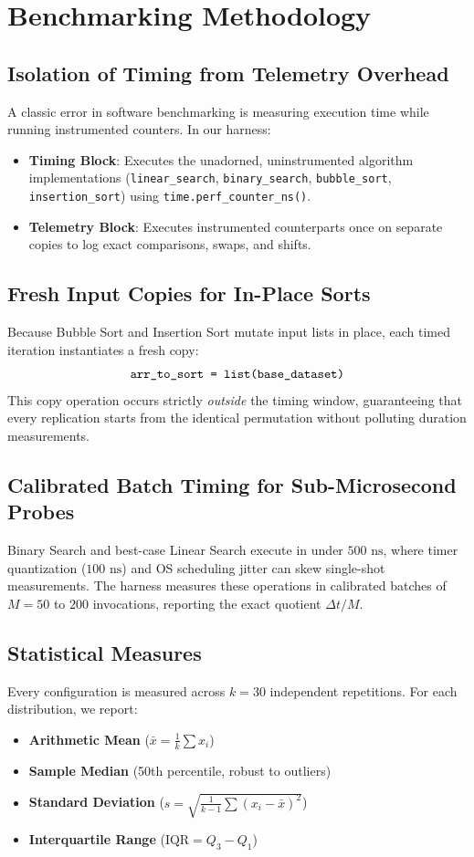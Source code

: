 \documentclass[11pt,a4paper,oneside]{report}
\theoremstyle{definition}
\begin{document}
\section{Benchmarking Methodology}

\subsection{Isolation of Timing from Telemetry Overhead}
A classic error in software benchmarking is measuring execution time while running instrumented counters. In our harness:
\begin{itemize}
    \item \textbf{Timing Block}: Executes the unadorned, uninstrumented algorithm implementations (\texttt{linear\_search}, \texttt{binary\_search}, \texttt{bubble\_sort}, \texttt{insertion\_sort}) using \texttt{time.perf\_counter\_ns()}.
    \item \textbf{Telemetry Block}: Executes instrumented counterparts once on separate copies to log exact comparisons, swaps, and shifts.
\end{itemize}

\subsection{Fresh Input Copies for In-Place Sorts}
Because Bubble Sort and Insertion Sort mutate input lists in place, each timed iteration instantiates a fresh copy:
$$\text{\texttt{arr\_to\_sort = list(base\_dataset)}}$$
This copy operation occurs strictly \emph{outside} the timing window, guaranteeing that every replication starts from the identical permutation without polluting duration measurements.

\subsection{Calibrated Batch Timing for Sub-Microsecond Probes}
Binary Search and best-case Linear Search execute in under $500\text{ ns}$, where timer quantization ($100\text{ ns}$) and OS scheduling jitter can skew single-shot measurements. The harness measures these operations in calibrated batches of $M = 50$ to $200$ invocations, reporting the exact quotient $\Delta t / M$.

\subsection{Statistical Measures}
Every configuration is measured across $k = 30$ independent repetitions. For each distribution, we report:
\begin{itemize}
    \item \textbf{Arithmetic Mean} ($\bar{x} = \frac{1}{k} \sum x_i$)
    \item \textbf{Sample Median} (50th percentile, robust to outliers)
    \item \textbf{Standard Deviation} ($s = \sqrt{\frac{1}{k-1} \sum (x_i - \bar{x})^2}$)
    \item \textbf{Interquartile Range} ($\text{IQR} = Q_3 - Q_1$)
\end{itemize}
\end{document}
